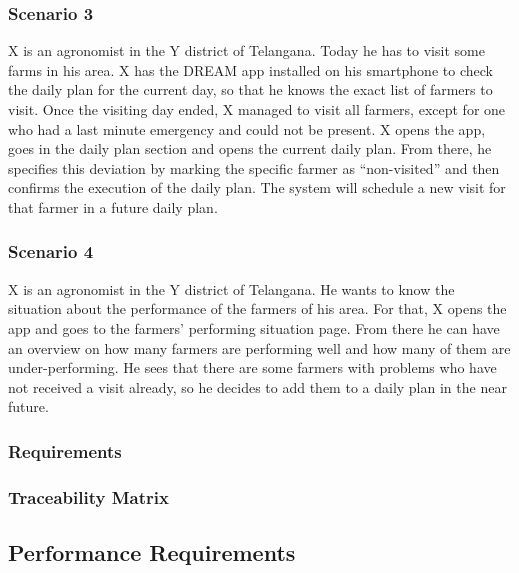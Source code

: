 \subsubsection*{Scenario 3}
X is an agronomist in the Y district of Telangana. Today he has to visit some farms in his area. X has the DREAM app installed on his smartphone to check the daily plan for the current day, so that he knows the exact list of farmers to visit. Once the visiting day ended, X managed to visit all farmers, except for one who had a last minute emergency and could not be present. X opens the app, goes in the daily plan section and opens the current daily plan. From there, he specifies this deviation by marking the specific farmer as “non-visited” and then confirms the execution of the daily plan. The system will schedule a new visit for that farmer in a future daily plan.

\subsubsection*{Scenario 4}
X is an agronomist in the Y district of Telangana. He wants to know the situation about the performance of the farmers of his area. For that, X opens the app and goes to the farmers’ performing situation page. From there he can have an overview on how many farmers are performing well and how many of them are under-performing. He sees that there are some farmers with problems who have not received a visit already, so he decides to add them to a daily plan in the near future.

\subsubsection{Requirements}
\subsubsection{Traceability Matrix}

\subsection{Performance Requirements}

